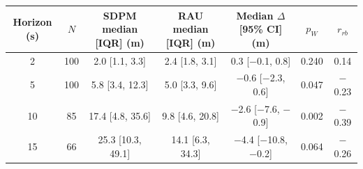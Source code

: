 \begin{tabular}{ccccccc}
\toprule
Horizon (s) & $N$ & SDPM median [IQR] (m) & RAU median [IQR] (m) & Median $\Delta$ [95\% CI] (m) & $p_W$ & $r_{rb}$ \\
\midrule
2 & 100 & 2.0 [1.1, 3.3] & 2.4 [1.8, 3.1] & 0.3 [\ensuremath{-}0.1, 0.8] & 0.240 & 0.14 \\
5 & 100 & 5.8 [3.4, 12.3] & 5.0 [3.3, 9.6] & \ensuremath{-}0.6 [\ensuremath{-}2.3, 0.6] & 0.047 & \ensuremath{-}0.23 \\
10 & 85 & 17.4 [4.8, 35.6] & 9.8 [4.6, 20.8] & \ensuremath{-}2.6 [\ensuremath{-}7.6, \ensuremath{-}0.9] & 0.002 & \ensuremath{-}0.39 \\
15 & 66 & 25.3 [10.3, 49.1] & 14.1 [6.3, 34.3] & \ensuremath{-}4.4 [\ensuremath{-}10.8, \ensuremath{-}0.2] & 0.064 & \ensuremath{-}0.26 \\
\bottomrule
\end{tabular}
